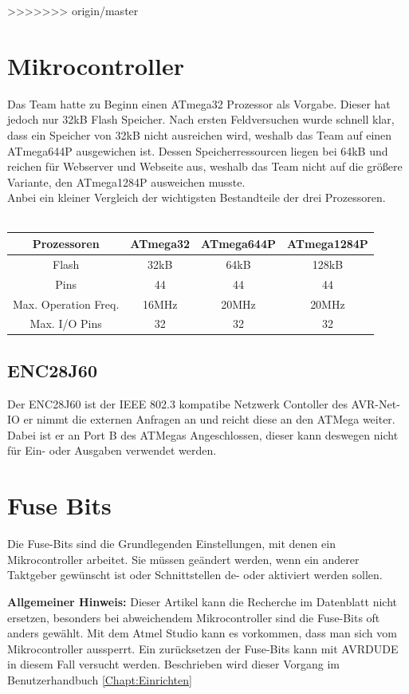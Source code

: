 >>>>>>> origin/master
\section{Mikrocontroller}
Das Team hatte zu Beginn einen ATmega32 Prozessor als Vorgabe. Dieser hat jedoch nur 32kB Flash Speicher. Nach ersten 
Feldversuchen wurde schnell klar, dass ein Speicher von 32kB nicht ausreichen wird, weshalb das Team auf einen ATmega644P 
ausgewichen ist. Dessen Speicherressourcen liegen bei 64kB und reichen für Webserver und Webseite aus, weshalb das Team 
nicht auf die größere Variante, den ATmega1284P ausweichen musste.\\ Anbei ein kleiner Vergleich der wichtigsten Bestandteile der 
drei Prozessoren.\\ \\ 
\begin{tabular}{|c|c|c|c|} \hline
  Prozessoren & ATmega32 & ATmega644P & ATmega1284P \\ \hline 
  Flash & 32kB & 64kB & 128kB \\ \hline
  Pins & 44 & 44 & 44 \\ \hline
  Max. Operation Freq. & 16MHz & 20MHz & 20MHz\\ \hline
  Max. I/O Pins & 32 & 32 & 32 \\ \hline
  
 \end{tabular}


\subsection{ENC28J60}

Der ENC28J60 ist der IEEE 802.3 kompatibe Netzwerk Contoller des AVR-Net-IO er
nimmt die externen Anfragen an und reicht diese an den ATMega weiter. Dabei ist
er an Port B des ATMegas Angeschlossen, dieser kann deswegen nicht für Ein- oder
Ausgaben verwendet werden.

\section{Fuse Bits}
\label{chap:Fuse}

Die Fuse-Bits sind die Grundlegenden Einstellungen, mit denen ein
Mikrocontroller arbeitet. Sie müssen geändert werden, wenn ein anderer Taktgeber
gewünscht ist oder Schnittstellen de- oder aktiviert werden sollen.

\begin{myframe}
\textbf{Allgemeiner Hinweis:} Dieser Artikel kann die Recherche im Datenblatt
nicht ersetzen, besonders bei abweichendem Mikrocontroller sind die Fuse-Bits
oft anders gewählt. Mit dem Atmel Studio kann es vorkommen, dass man sich vom
Mikrocontroller aussperrt. Ein zurücksetzen der Fuse-Bits kann mit AVRDUDE
in diesem Fall versucht werden. Beschrieben wird dieser Vorgang im
Benutzerhandbuch \ref{Chapt:Einrichten}
\end{myframe}

